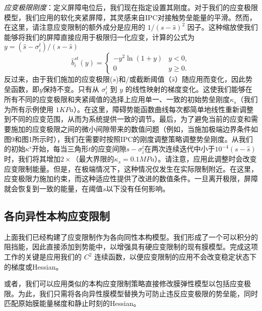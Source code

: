 \textit{应变极限刚度}：定义屏障电位后，我们现在指定设置其刚度。对于我们的应变极限模型，我们应用的软化夹紧屏障，其灵感来自IPC对接触势垒能量的平滑。然而，在这里，请注意应变限制的额外成分是应用的 $1/(s − \hat s)^2$ 因子。这种缩放使我们能够将我们的屏障直接应用于极限归一化应变，计算的公式为 $y = (\hat s − \sigma_i^t )/(s −\hat s)$
\begin{equation}
  \hat b_i ^{st}(y) = \begin{cases}
    - y ^ 2\ln(1 + y) & y < 0,\\
    0 & y\ge 0.
  \end{cases}
\end{equation}
反过来，由于我们施加的应变极限($s$)和/或截断阈值（$\hat s$）随应用而变化，因此势垒函数，即$y$保持不变。只有从 $\sigma_i^t$ 到 $y$ 的线性映射的梯度变化。这使我们能够在所有不同的应变极限和夹紧阈值的选择上应用单一、一致的初始势垒刚度$\kappa_s$（我们为所有示例使用 $1KPa$）。在这里，障碍势能函数曲线每次都简单地线性重新调整到不同的应变范围，从而为系统提供一致的调节。最后，为了避免当前的应变和需要施加的应变极限之间的微小间隙带来的数值问题（例如，当施加极端边界条件如图9和图1所示时），我们在需要时按照IPC的刚度调整策略调整势垒刚度。从我们的初始$κ^s$开始，每当三角形$t$的应变间隙$s − \sigma_i^t$在两次连续迭代中小于$10^{-4}(s − \hat s)$时，我们将其增加$2\times$（最大界限的$\kappa_s = 0.1MPa$）。请注意，应用此调整时会改变应变限制能量。但是，在极端情况下，这种情况仅发生在实际限制附近。在这里，应变极限力施加约束，而这种适应性提供了改进的数值条件。一旦离开极限，屏障就会恢复到一致的能量，在阈值$s$以下没有任何影响。

\subsection{各向异性本构应变限制}

上面我们已经构建了应变限制作为各向同性本构模型。我们形成了一个可以积分的阻挡能，因此直接添加到势能中，以增强具有硬应变限制的现有膜模型。完成这项工作的关键是应用我们的 $C^2$ 连续函数，以便应变限制的应用不会改变稳定状态下的梯度或Hessian。

或者，我们可以应用类似的本构应变限制策略直接修改膜弹性模型以包括应变极限。为此，我们只需将各向异性膜模型替换为可防止违反应变极限的势垒能，同时匹配原始膜能量梯度和静止时刻的Hessian。

